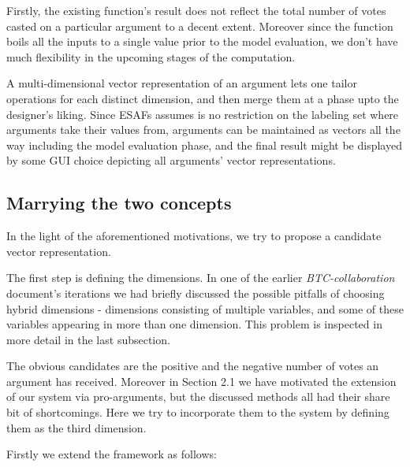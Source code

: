 \documentclass{article}
\begin{document}
Firstly, the existing function's result does not reflect the total number of votes casted on a particular argument to a decent extent. Moreover since the function boils all the inputs to a single value prior to the model evaluation, we don't have much flexibility in the upcoming stages of the computation.

A multi-dimensional vector representation of an argument lets one tailor operations for each distinct dimension, and then merge them at a phase upto the designer's liking. Since ESAFs assumes is no restriction on the labeling set where arguments take their values from, arguments can be maintained as vectors all the way including the model evaluation phase, and the final result might be displayed by some GUI choice depicting all arguments' vector representations. 

\subsection{Marrying the two concepts}

In the light of the aforementioned motivations, we try to propose a candidate vector representation. 

The first step is defining the dimensions. In one of the earlier \emph{BTC-collaboration} document's iterations we had briefly discussed the possible pitfalls of choosing hybrid dimensions - dimensions consisting of multiple variables, and some of these variables appearing in more than one dimension. This problem is inspected in more detail in the last subsection.

The obvious candidates are the positive and the negative number of votes an argument has received. Moreover in Section 2.1 we have motivated the extension of our system via pro-arguments, but the discussed methods all had their share bit of shortcomings. Here we try to incorporate them to the system by defining them as the third dimension.

Firstly we extend the framework as follows:
\end{document}
